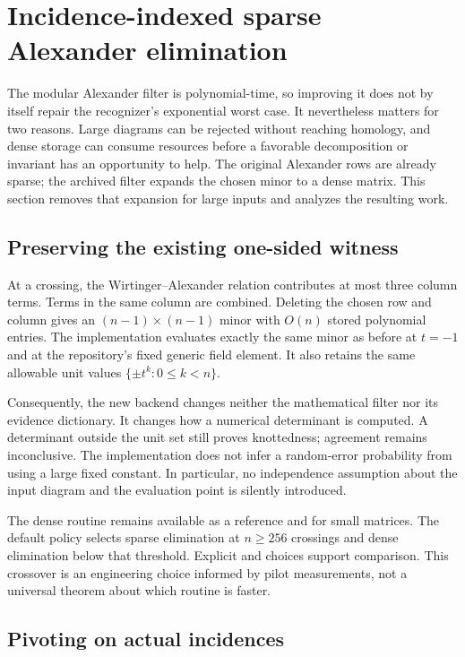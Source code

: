 \section{Incidence-indexed sparse Alexander elimination}
\label{sec:sparse}

The modular Alexander filter is polynomial-time, so improving it does not
by itself repair the recognizer's exponential worst case.  It nevertheless
matters for two reasons.  Large diagrams can be rejected without reaching
homology, and dense storage can consume resources before a favorable
decomposition or invariant has an opportunity to help.  The original
Alexander rows are already sparse; the archived filter expands the chosen
minor to a dense matrix.  This section removes that expansion for large
inputs and analyzes the resulting work.

\subsection{Preserving the existing one-sided witness}

At a crossing, the Wirtinger--Alexander relation contributes at most three
column terms.  Terms in the same column are combined.  Deleting the chosen
row and column gives an $(n-1)\times(n-1)$ minor with $O(n)$ stored polynomial
entries.  The implementation evaluates exactly the same minor as before at
$t=-1$ and at the repository's fixed generic field element.  It also retains
the same allowable unit values $\{\pm t^k:0\leq k<n\}$.

Consequently, the new backend changes neither the mathematical filter nor
its evidence dictionary.  It changes how a numerical determinant is
computed.  A determinant outside the unit set still proves knottedness;
agreement remains inconclusive.  The implementation does not infer a
random-error probability from using a large fixed constant.  In particular,
no independence assumption about the input diagram and the evaluation point
is silently introduced.

The dense routine remains available as a reference and for small matrices.
The default  policy selects sparse elimination at $n\geq256$
crossings and dense elimination below that threshold.  Explicit
 and  choices support comparison.  This crossover
is an engineering choice informed by pilot measurements, not a universal
theorem about which routine is faster.

\subsection{Pivoting on actual incidences}


